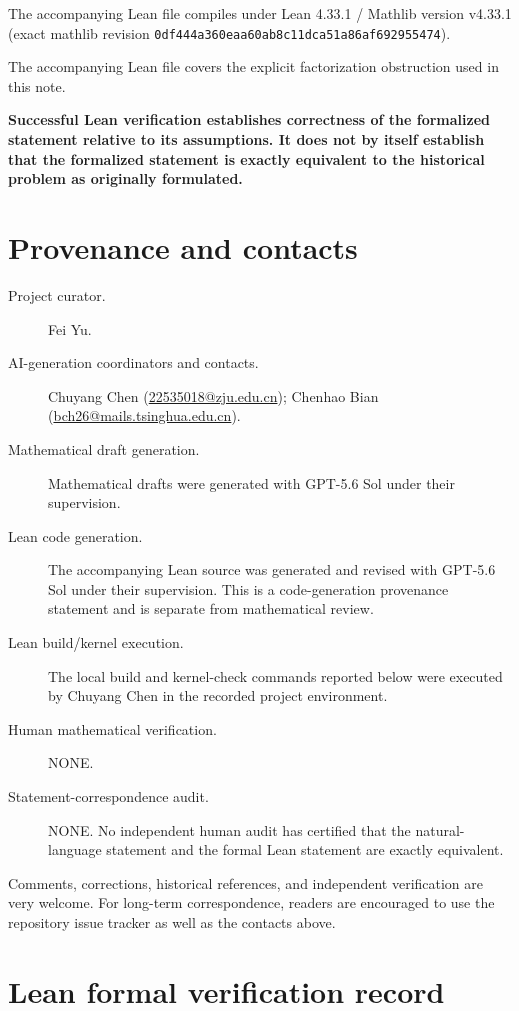 \documentclass[11pt]{article}
\theoremstyle{remark}
\begin{document}
\medskip
\noindent The accompanying Lean file compiles under Lean 4.33.1 / Mathlib version v4.33.1 (exact mathlib revision \texttt{0df444a360eaa60ab8c11dca51a86af692955474}).

\medskip
\noindent The accompanying Lean file covers the explicit factorization obstruction used in this note.

\medskip
\noindent\textbf{Successful Lean verification establishes correctness of the formalized statement relative to its assumptions. It does not by itself establish that the formalized statement is exactly equivalent to the historical problem as originally formulated.}
\endgroup

\section*{Provenance and contacts}
\begingroup\small\sloppy
\begin{description}
\item[Project curator.] Fei Yu.
\item[AI-generation coordinators and contacts.] Chuyang Chen (\href{mailto:22535018@zju.edu.cn}{22535018@zju.edu.cn}); Chenhao Bian (\href{mailto:bch26@mails.tsinghua.edu.cn}{bch26@mails.tsinghua.edu.cn}).
\item[Mathematical draft generation.] Mathematical drafts were generated with GPT-5.6 Sol under their supervision.
\item[Lean code generation.] The accompanying Lean source was generated and revised with GPT-5.6 Sol under their supervision. This is a code-generation provenance statement and is separate from mathematical review.
\item[Lean build/kernel execution.] The local build and kernel-check commands reported below were executed by Chuyang Chen in the recorded project environment.
\item[Human mathematical verification.] NONE.
\item[Statement-correspondence audit.] NONE. No independent human audit has certified that the natural-language statement and the formal Lean statement are exactly equivalent.
\end{description}
\medskip
\noindent Comments, corrections, historical references, and independent verification are very welcome. For long-term correspondence, readers are encouraged to use the repository issue tracker as well as the contacts above.
\endgroup

\section*{Lean formal verification record}
\end{document}
